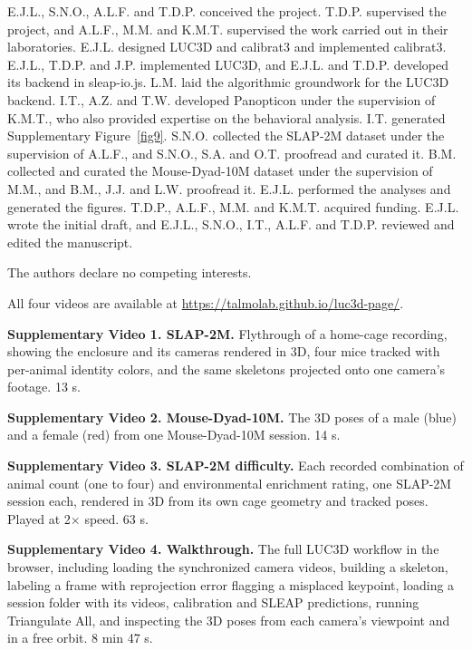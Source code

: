\documentclass[pdflatex, sn-nature]{sn-jnl}
\theoremstyle{thmstyleone}%
\theoremstyle{thmstyletwo}%
\theoremstyle{thmstylethree}%
\begin{document}
E.J.L., S.N.O., A.L.F. and T.D.P. conceived the project. T.D.P. supervised the project, and A.L.F., M.M. and K.M.T. supervised the work carried out in their laboratories. E.J.L. designed LUC3D and calibrat3 and implemented calibrat3. E.J.L., T.D.P. and J.P. implemented LUC3D, and E.J.L. and T.D.P. developed its backend in sleap-io.js. L.M. laid the algorithmic groundwork for the LUC3D backend. I.T., A.Z. and T.W. developed Panopticon under the supervision of K.M.T., who also provided expertise on the behavioral analysis. I.T. generated Supplementary Figure~\ref{fig9}. S.N.O. collected the SLAP-2M dataset under the supervision of A.L.F., and S.N.O., S.A. and O.T. proofread and curated it. B.M. collected and curated the Mouse-Dyad-10M dataset under the supervision of M.M., and B.M., J.J. and L.W. proofread it. E.J.L. performed the analyses and generated the figures. T.D.P., A.L.F., M.M. and K.M.T. acquired funding. E.J.L. wrote the initial draft, and E.J.L., S.N.O., I.T., A.L.F. and T.D.P. reviewed and edited the manuscript.

The authors declare no competing interests.


All four videos are available at \url{https://talmolab.github.io/luc3d-page/}.

\textbf{Supplementary Video 1. SLAP-2M.} Flythrough of a home-cage recording, showing the enclosure and its cameras rendered in 3D, four mice tracked with per-animal identity colors, and the same skeletons projected onto one camera's footage. 13 s.

\textbf{Supplementary Video 2. Mouse-Dyad-10M.} The 3D poses of a male (blue) and a female (red) from one Mouse-Dyad-10M session. 14 s.

\textbf{Supplementary Video 3. SLAP-2M difficulty.} Each recorded combination of animal count (one to four) and environmental enrichment rating, one SLAP-2M session each, rendered in 3D from its own cage geometry and tracked poses. Played at 2$\times$ speed. 63 s.

\textbf{Supplementary Video 4. Walkthrough.} The full LUC3D workflow in the browser, including loading the synchronized camera videos, building a skeleton, labeling a frame with reprojection error flagging a misplaced keypoint, loading a session folder with its videos, calibration and SLEAP predictions, running Triangulate All, and inspecting the 3D poses from each camera's viewpoint and in a free orbit. 8 min 47 s.
\end{document}
